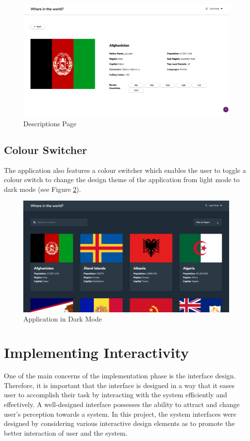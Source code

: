 \documentclass[twoside, a4paper, 12pt]{report}
\begin{document}
\begin{figure}
	\centering
	\includegraphics[width=1.0\textwidth]{DescriptionsPage.png}
	\caption{Descriptions Page}
	\label{fig:descriptions_page}
\end{figure}

\subsection{Colour Switcher}
The application also features a colour switcher which enables the user to toggle a colour switch to change the design theme of the application from light mode to dark mode (see Figure \ref{fig:darkmode}).

\begin{figure} [ht]
	\centering
	\includegraphics[width=1.0\textwidth]{darkmode.png}
	\caption{Application in Dark Mode}
	\label{fig:darkmode}
\end{figure}

\section{Implementing Interactivity}
One of the main concerns of the implementation phase is the interface design. Therefore, it is important that the interface is designed in a way that it eases user to accomplish their task by interacting with the system efficiently and effectively. A well-designed interface possesses the ability to attract and change user’s perception towards a system. In this project, the system interfaces were designed by considering various interactive design elements as to promote the better interaction of user and the system.
\end{document}

